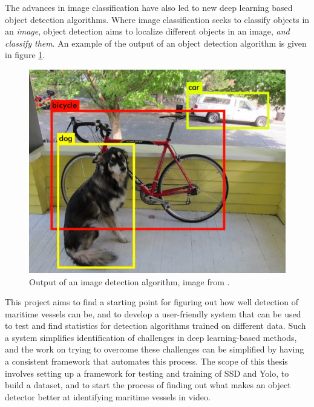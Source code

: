 \vspace{3mm}

\noindent
The advances in image classification have also led to new deep learning based object detection algorithms. Where image classification seeks to classify objects in an \textit{image}, object detection aims to localize different objects in an image, \textit{and classify them}. An example of the output of an object detection algorithm is given in figure \ref{fig:imdet}. 

\begin{figure}[h!]
\centering
\includegraphics[scale=0.3]{images/imdet.png}
\caption{Output of an image detection algorithm, image from \citep{YOLOv1}.}
\label{fig:imdet}
\end{figure}



This project aims to find a starting point for figuring out how well detection of maritime vessels can be, and to develop a user-friendly system that can be used to test and find statistics for detection algorithms trained on different data. Such a system simplifies identification of challenges in deep learning-based methods, and the work on trying to overcome these challenges can be simplified by having a consistent framework that automates this process. The scope of this thesis involves setting up a framework for testing and training of SSD and Yolo, to build a dataset, and to start the process of finding out what makes an object detector better at identifying maritime vessels in video.


\cleardoublepage